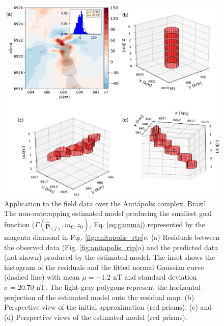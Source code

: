 \begin{figure}
	\centering
	\includegraphics[width=\linewidth]{figures/real_results_magenta_diamond.png}
	\caption{Application to the field data over the Anit{\'a}polis complex, Brazil.
	The non-outcropping estimated model producing the smallest goal function 
	($ \Gamma(\hat{\mathbf{p}}_{(f)}, m_0, z_0)$, Eq. \ref{eq:gamma})	represented by the magenta diamond 
	in Fig. \ref{fig:anitapolis_rtp}c.
	(a) Residuals between the observed data (Fig. \ref{fig:anitapolis_rtp}a) and the 
	predicted data (not shown) produced by the estimated model. 
	The inset shows the histogram of the residuals and the fitted normal 
	Gaussian curve (dashed line) with mean $\mu = -1.2$ nT and 
	standard deviation $\sigma = 20.70$ nT.
	The light-gray polygons represent the horizontal projection of the estimated 
	model onto the residual map. 
	(b) Perspective view of the initial approximation (red prisms). 
	(c) and (d) Perspective views of the estimated model (red prisms).}
	\label{fig:real_result2}
\end{figure}

